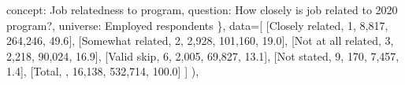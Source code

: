 \documentclass[
  11pt,
  a4paper,
]{article}
\newenvironment{Shaded}{\begin{snugshade}}{\end{snugshade}}
\newcommand{\NormalTok}[1]{\textcolor[rgb]{0.00,0.23,0.31}{#1}}
\newcommand{\OperatorTok}[1]{\textcolor[rgb]{0.37,0.37,0.37}{#1}}
\newcommand{\StringTok}[1]{\textcolor[rgb]{0.13,0.47,0.30}{#1}}
\begin{document}
\begin{Shaded}
\begin{Highlighting}[]
                    \StringTok{\textquotesingle{}concept\textquotesingle{}}\NormalTok{: }\StringTok{\textquotesingle{}Job relatedness to program\textquotesingle{}}\NormalTok{,}
                    \StringTok{\textquotesingle{}question\textquotesingle{}}\NormalTok{: }\StringTok{\textquotesingle{}How closely is job related to 2020 program?\textquotesingle{}}\NormalTok{,}
                    \StringTok{\textquotesingle{}universe\textquotesingle{}}\NormalTok{: }\StringTok{\textquotesingle{}Employed respondents\textquotesingle{}}
\NormalTok{                \},}
\NormalTok{                data}\OperatorTok{=}\NormalTok{[}
\NormalTok{                    [}\StringTok{\textquotesingle{}Closely related\textquotesingle{}}\NormalTok{, }\StringTok{\textquotesingle{}1\textquotesingle{}}\NormalTok{, }\StringTok{\textquotesingle{}8,817\textquotesingle{}}\NormalTok{, }\StringTok{\textquotesingle{}264,246\textquotesingle{}}\NormalTok{, }\StringTok{\textquotesingle{}49.6\textquotesingle{}}\NormalTok{],}
\NormalTok{                    [}\StringTok{\textquotesingle{}Somewhat related\textquotesingle{}}\NormalTok{, }\StringTok{\textquotesingle{}2\textquotesingle{}}\NormalTok{, }\StringTok{\textquotesingle{}2,928\textquotesingle{}}\NormalTok{, }\StringTok{\textquotesingle{}101,160\textquotesingle{}}\NormalTok{, }\StringTok{\textquotesingle{}19.0\textquotesingle{}}\NormalTok{],}
\NormalTok{                    [}\StringTok{\textquotesingle{}Not at all related\textquotesingle{}}\NormalTok{, }\StringTok{\textquotesingle{}3\textquotesingle{}}\NormalTok{, }\StringTok{\textquotesingle{}2,218\textquotesingle{}}\NormalTok{, }\StringTok{\textquotesingle{}90,024\textquotesingle{}}\NormalTok{, }\StringTok{\textquotesingle{}16.9\textquotesingle{}}\NormalTok{],}
\NormalTok{                    [}\StringTok{\textquotesingle{}Valid skip\textquotesingle{}}\NormalTok{, }\StringTok{\textquotesingle{}6\textquotesingle{}}\NormalTok{, }\StringTok{\textquotesingle{}2,005\textquotesingle{}}\NormalTok{, }\StringTok{\textquotesingle{}69,827\textquotesingle{}}\NormalTok{, }\StringTok{\textquotesingle{}13.1\textquotesingle{}}\NormalTok{],}
\NormalTok{                    [}\StringTok{\textquotesingle{}Not stated\textquotesingle{}}\NormalTok{, }\StringTok{\textquotesingle{}9\textquotesingle{}}\NormalTok{, }\StringTok{\textquotesingle{}170\textquotesingle{}}\NormalTok{, }\StringTok{\textquotesingle{}7,457\textquotesingle{}}\NormalTok{, }\StringTok{\textquotesingle{}1.4\textquotesingle{}}\NormalTok{],}
\NormalTok{                    [}\StringTok{\textquotesingle{}Total\textquotesingle{}}\NormalTok{, }\StringTok{\textquotesingle{}\textquotesingle{}}\NormalTok{, }\StringTok{\textquotesingle{}16,138\textquotesingle{}}\NormalTok{, }\StringTok{\textquotesingle{}532,714\textquotesingle{}}\NormalTok{, }\StringTok{\textquotesingle{}100.0\textquotesingle{}}\NormalTok{]}
\NormalTok{                ]}
\NormalTok{            ),}
            

\end{Highlighting}
\end{Shaded}
\end{document}
